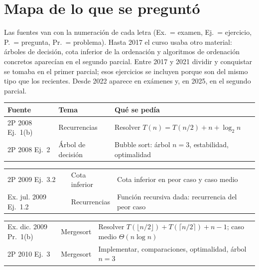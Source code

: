\section{Mapa de lo que se preguntó}

Las fuentes van con la numeración de cada letra (Ex.~= examen, Ej.~= ejercicio, P.~= pregunta, Pr.~= problema). Hasta 2017 el curso usaba otro material: árboles de decisión, cota inferior de la ordenación y algoritmos de ordenación concretos aparecían en el segundo parcial. Entre 2017 y 2021 dividir y conquistar se tomaba en el primer parcial; esos ejercicios se incluyen porque son del mismo tipo que los recientes. Desde 2022 aparece en exámenes y, en 2025, en el segundo parcial.

{\small
\renewcommand{\arraystretch}{1.05}
\begin{tabularx}{\textwidth}{@{}>{\raggedright\arraybackslash}p{2.95cm}>{\raggedright\arraybackslash}p{2.75cm}>{\raggedright\arraybackslash}X@{}}
\toprule
Fuente & Tema & Qué se pedía \\
\midrule
2P 2008 Ej.~1(b) & Recurrencias & Resolver $T(n)=T(n/2)+n+\log_2 n$ \\
2P 2008 Ej.~2 & Árbol de decisión & Bubble sort: árbol $n=3$, estabilidad, optimalidad \\
\end{tabularx}\par\vspace{-\parskip}
\begin{tabularx}{\textwidth}{@{}>{\raggedright\arraybackslash}p{2.95cm}>{\raggedright\arraybackslash}p{2.75cm}>{\raggedright\arraybackslash}X@{}}
2P 2009 Ej.~3.2 & Cota inferior & Cota inferior en peor caso y caso medio \\
Ex. jul. 2009 Ej.~1.2 & Recurrencias & Función recursiva dada: recurrencia del peor caso \\
\end{tabularx}\par\vspace{-\parskip}
\begin{tabularx}{\textwidth}{@{}>{\raggedright\arraybackslash}p{2.95cm}>{\raggedright\arraybackslash}p{2.75cm}>{\raggedright\arraybackslash}X@{}}
Ex. dic. 2009 Pr.~1(b) & Mergesort & Resolver $T(\lfloor n/2\rfloor)+T(\lceil n/2\rceil)+n-1$; caso medio $\Theta(n\log n)$ \\
2P 2010 Ej.~3 & Mergesort & Implementar, comparaciones, optimalidad, árbol $n=3$ \\

\end{tabularx}}
